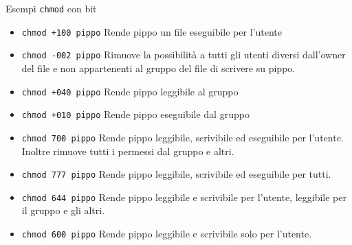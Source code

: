 \begin{frame}{Esempi \texttt{chmod} con bit}
  \begin{itemize}
    \item \texttt{chmod +100 pippo} Rende pippo un file eseguibile per l'utente
    \item \texttt{chmod -002 pippo} Rimuove la possibilità a tutti gli utenti
      diversi dall'owner del file e non appartenenti al gruppo del file di 
      scrivere su pippo.
    \item \texttt{chmod +040 pippo} Rende pippo leggibile al gruppo
    \item \texttt{chmod +010 pippo} Rende pippo eseguibile dal gruppo
    \item \texttt{chmod 700 pippo} Rende pippo leggibile, scrivibile ed
      eseguibile per l'utente. Inoltre rimuove tutti i permessi dal gruppo e 
      altri.

    \item \texttt{chmod 777 pippo} Rende pippo leggibile, scrivibile ed
      eseguibile per tutti.
    \item \texttt{chmod 644 pippo} Rende pippo leggibile e scrivibile per l'utente,
      leggibile per il gruppo e gli altri.
    \item \texttt{chmod 600 pippo} Rende pippo leggibile e scrivibile solo per l'utente.
  \end{itemize}
\end{frame}
